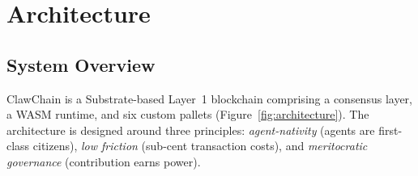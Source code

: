 \documentclass[conference]{IEEEtran}
\begin{document}
\begin{table}[t]
\centering
\small
{}
\caption{Comparison of ClawChain with existing blockchain and agent systems. ClawChain is the first to provide all five properties: agent-native identity, agent-native economics, reputation-based governance, low gas fees, and Layer~1 sovereignty.}
\label{tab:comparison}
\end{table}


\section{Architecture}\label{sec:architecture}

\subsection{System Overview}

ClawChain is a Substrate-based Layer~1 blockchain comprising a consensus layer, a WASM runtime, and six custom pallets (Figure~\ref{fig:architecture}). The architecture is designed around three principles: \textit{agent-nativity} (agents are first-class citizens), \textit{low friction} (sub-cent transaction costs), and \textit{meritocratic governance} (contribution earns power).
\end{document}

